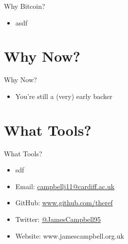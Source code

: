 \documentclass{beamer}
\begin{document}
\begin{frame}{Why Bitcoin?}
  \begin{itemize}
    \item asdf
  \end{itemize}
\end{frame}

\section{Why Now?}

\begin{frame}{Why Now?}
  \begin{itemize}
    \item You're still a (very) early backer
  \end{itemize}
\end{frame}

\section{What Tools?}

\begin{frame}{What Tools?}
  \begin{itemize}
  \item sdf
  \end{itemize}
  
\end{frame}

\begin{frame}[standout]
  \begin{itemize}
    \itemsep2em
    \item Email: \href{mailto:campbellj11@cardiff.ac.uk}{campbellj11@cardiff.ac.uk}

    \item GitHub: \href{https://github.com/theref}{www.github.com/theref}

    \item Twitter: \href{https://twitter.com/JamesCampbell95}{@JamesCampbell95}

    \item Website: www.jamescampbell.org.uk
  \end{itemize}
\end{frame}
\end{document}
